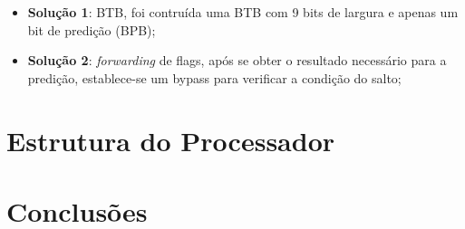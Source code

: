 \documentclass[11pt]{article}
\numberwithin{equation}{section}
\begin{document}
\begin{itemize}
	\item \textbf{Solução 1}: BTB, foi contruída uma BTB com 9 bits de largura e apenas um bit de predição (BPB);
	\item \textbf{Solução 2}: \textit{forwarding} de flags, após se obter o resultado necessário para a predição, establece-se um bypass para verificar a condição do salto;
	\vspace{-2.5mm}
\end{itemize}



\section{Estrutura do Processador}

\section{Conclusões}

\pagebreak

\listoftodos
\end{document}
